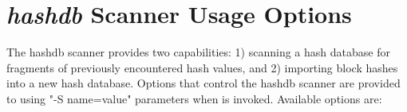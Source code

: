\documentclass[11pt,fleqn]{article} %
\begin{document}
\section{\bulk \textit{hashdb} Scanner Usage Options}
\label{scannerOptionsAppendix}
The \bulk hashdb scanner provides two capabilities: 1) scanning
a hash database for fragments of previously encountered hash values,
and 2) importing block hashes into a new hash database.
Options that control the hashdb
scanner are provided to \bulk using "-S name=value" parameters
when \bulk is invoked.  Available options are: 

\begingroup
\footnotesize
{
\selectfont

}
\endgroup
\end{document}
